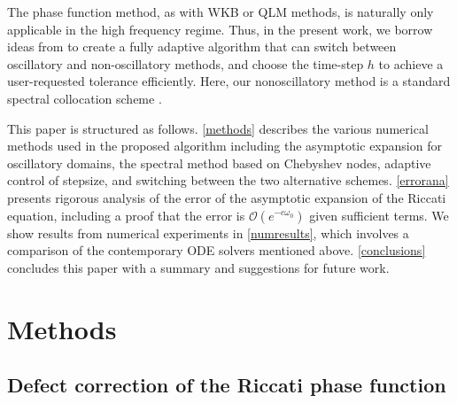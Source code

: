 \documentclass[10pt]{article}
\newcommand{\bigO}{{\mathcal O}}
\newcommand{\om}{\omega}
\begin{document}
%
The phase function method, as with WKB or QLM methods,
is naturally only applicable in the high frequency regime.
Thus, in the present work, we borrow ideas from \cite{agocs2020efficient} to
create a fully adaptive algorithm that can switch 
between oscillatory and non-oscillatory methods,
and choose the time-step $h$ to achieve a user-requested
tolerance efficiently.
Here, our nonoscillatory method is a standard spectral collocation scheme
\cite{tref}.  %

This paper is structured as follows. \cref{methods} describes the various
numerical methods used in the proposed algorithm including the asymptotic
expansion for oscillatory domains, the spectral method based on Chebyshev
nodes, adaptive control of stepsize, and switching between the two alternative
schemes.
\cref{errorana} presents rigorous analysis of the error of
the asymptotic expansion of the Riccati equation,
including a proof that the error is $\bigO(e^{-c\om_0})$ given sufficient terms.
We show results from numerical experiments in
\cref{numresults}, which involves a comparison of the contemporary ODE solvers
mentioned above. \cref{conclusions} concludes this paper with a summary and
suggestions for future work.




\section{Methods \label{methods}}

\subsection{Defect correction of the Riccati phase function}
  \label{phasefun}
\end{document}
